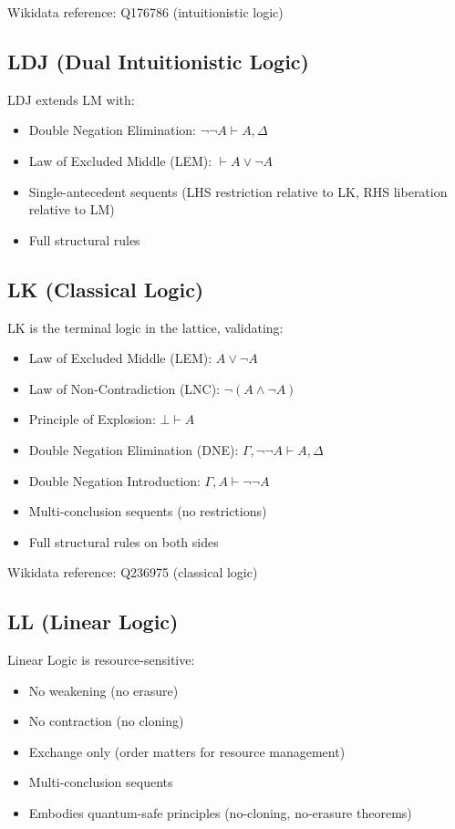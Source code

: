 Wikidata reference: Q176786 (intuitionistic logic)

\subsection*{LDJ (Dual Intuitionistic Logic)}

LDJ extends LM with:
\begin{itemize}
    \item Double Negation Elimination: $\neg \neg A \vdash A, \Delta$
    \item Law of Excluded Middle (LEM): $\vdash A \vee \neg A$
    \item Single-antecedent sequents (LHS restriction relative to LK, RHS liberation relative to LM)
    \item Full structural rules
\end{itemize}

\subsection*{LK (Classical Logic)}

LK is the terminal logic in the lattice, validating:
\begin{itemize}
    \item Law of Excluded Middle (LEM): $A \vee \neg A$
    \item Law of Non-Contradiction (LNC): $\neg(A \wedge \neg A)$
    \item Principle of Explosion: $\bot \vdash A$
    \item Double Negation Elimination (DNE): $\Gamma, \neg\neg A \vdash A, \Delta$
    \item Double Negation Introduction: $\Gamma, A \vdash \neg \neg A$
    \item Multi-conclusion sequents (no restrictions)
    \item Full structural rules on both sides
\end{itemize}

Wikidata reference: Q236975 (classical logic)

\subsection*{LL (Linear Logic)}

Linear Logic is resource-sensitive:
\begin{itemize}
    \item No weakening (no erasure)
    \item No contraction (no cloning)
    \item Exchange only (order matters for resource management)
    \item Multi-conclusion sequents
    \item Embodies quantum-safe principles (no-cloning, no-erasure theorems)
\end{itemize}

